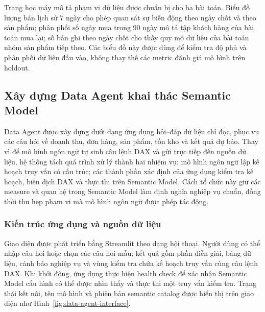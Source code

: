 
Trang học máy mô tả phạm vi dữ liệu được chuẩn bị cho ba bài toán. Biểu đồ lượng bán lịch sử 7 ngày cho phép quan sát sự biến động theo ngày chốt và theo sản phẩm; phân phối số ngày mua trong 90 ngày mô tả tập khách hàng của bài toán mua lại; số bản ghi theo ngày chốt cho thấy quy mô dữ liệu của bài toán nhóm sản phẩm tiếp theo. Các biểu đồ này được dùng để kiểm tra độ phủ và phân phối dữ liệu đầu vào, không thay thế các metric đánh giá mô hình trên holdout.


\subsection{Xây dựng Data Agent khai thác Semantic Model}

Data Agent được xây dựng dưới dạng ứng dụng hỏi--đáp dữ liệu chỉ đọc, phục vụ các câu hỏi về doanh thu, đơn hàng, sản phẩm, tồn kho và kết quả dự báo. Thay vì để mô hình ngôn ngữ tự sinh câu lệnh DAX và gửi trực tiếp đến nguồn dữ liệu, hệ thống tách quá trình xử lý thành hai nhiệm vụ: mô hình ngôn ngữ lập kế hoạch truy vấn có cấu trúc; các thành phần xác định của ứng dụng kiểm tra kế hoạch, biên dịch DAX và thực thi trên Semantic Model. Cách tổ chức này giữ các measure và quan hệ trong Semantic Model làm định nghĩa nghiệp vụ chuẩn, đồng thời thu hẹp phạm vi mà mô hình ngôn ngữ được phép tác động.

\subsubsection{Kiến trúc ứng dụng và nguồn dữ liệu}

Giao diện được phát triển bằng Streamlit theo dạng hội thoại. Người dùng có thể nhập câu hỏi hoặc chọn các câu hỏi mẫu; kết quả gồm phần diễn giải, bảng dữ liệu, cảnh báo nghiệp vụ và vùng kiểm tra chứa kế hoạch truy vấn cùng câu lệnh DAX. Khi khởi động, ứng dụng thực hiện health check để xác nhận Semantic Model cấu hình có thể được nhìn thấy và thực thi một truy vấn kiểm tra. Trạng thái kết nối, tên mô hình và phiên bản semantic catalog được hiển thị trên giao diện như Hình~\ref{fig:data-agent-interface}.


